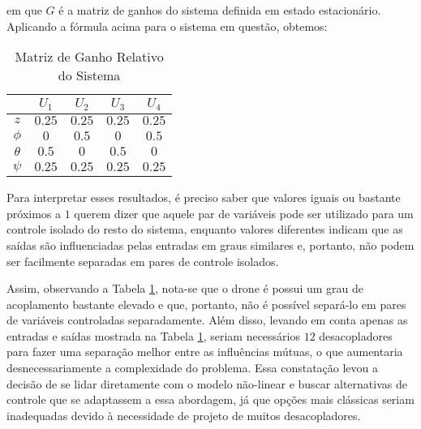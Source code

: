 \noindent em que $G$ é a matriz de ganhos do sistema definida em estado estacionário. Aplicando a fórmula 
acima para o sistema em questão, obtemos:
\begin{table}[h!]
    \centering
    \caption{Matriz de Ganho Relativo do Sistema}
    \begin{tabular}{c|cccc}
        & $U_1$ & $U_2$ & $U_3$ & $U_4$\\
        \hline
        $z$ & $0.25$ & $0.25$ & $0.25$ & $0.25$\\
        $\phi$ & $0$ & $0.5$ & $0$ & $0.5$\\
        $\theta$ & $0.5$ & $0$ & $0.5$ & $0$\\
        $\psi$ & $0.25$ & $0.25$ & $0.25$ & $0.25$
    \end{tabular}%
    \label{tab:rga}
\end{table}

\pagebreak

Para interpretar esses resultados, é preciso saber que valores iguais ou bastante próximos a $1$ 
querem dizer que aquele par de variáveis pode ser utilizado para um controle isolado do resto do sistema, 
enquanto valores diferentes indicam que as saídas são influenciadas pelas entradas em graus similares e, 
portanto, não podem ser facilmente separadas em pares de controle isolados.

Assim, observando a Tabela 
\ref{tab:rga}, nota-se que o drone é possui um grau de acoplamento bastante elevado e que, portanto, 
não é possível separá-lo em pares de variáveis controladas separadamente. Além disso, levando em conta 
apenas as entradas e saídas mostrada na Tabela \ref{tab:rga}, seriam necessários $12$ desacopladores para 
fazer uma separação melhor entre as influências mútuas, o que aumentaria desnecessariamente a complexidade 
do problema. Essa constatação levou a decisão de se lidar diretamente com o modelo não-linear e buscar 
alternativas de controle que se adaptassem a essa abordagem, já que opções mais clássicas seriam inadequadas 
devido à necessidade de projeto de muitos desacopladores.